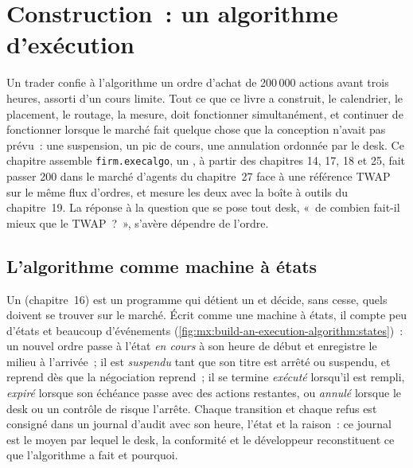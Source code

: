 \chapter{Construction~: un algorithme d'exécution}\label{ch:mx:build-an-execution-algorithm}

Un trader confie à l'algorithme un ordre d'achat de 200\,000 actions avant trois heures, assorti d'un cours limite. Tout ce que ce livre a construit, le calendrier,
le placement, le routage, la mesure, doit fonctionner simultanément, et continuer de fonctionner lorsque le marché fait quelque chose que la conception n'avait pas prévu~: une suspension, un pic de cours,
une annulation ordonnée par le desk. Ce chapitre assemble \texttt{firm.execalgo}, un , à partir des chapitres 14, 17, 18 et 25, fait passer
200  dans le marché d'agents du chapitre~27 face à une référence TWAP sur le même flux d'ordres, et mesure les deux avec la boîte à outils du chapitre~19. La
réponse à la question que se pose tout desk, «~de combien fait-il mieux que le TWAP~?~», s'avère dépendre de l'ordre.

\section{L'algorithme comme machine à états}

Un  (chapitre~16) est un programme qui détient un  et décide, sans cesse, quels  doivent se trouver sur le marché.
Écrit comme une machine à états, il compte peu d'états et beaucoup d'événements (\cref{fig:mx:build-an-execution-algorithm:states})~: un nouvel ordre passe à l'état \emph{en cours}
à son heure de début et enregistre le milieu à l'arrivée~; il est \emph{suspendu} tant que son titre est arrêté ou suspendu, et reprend dès que la négociation reprend~; il se termine \emph{exécuté}
lorsqu'il est rempli, \emph{expiré} lorsque son échéance passe avec des actions restantes, ou \emph{annulé} lorsque le desk ou un contrôle de risque l'arrête. Chaque transition et
chaque refus est consigné dans un journal d'audit avec son heure, l'état et la raison~: ce journal est le moyen par lequel le desk, la conformité et le développeur reconstituent ce que
l'algorithme a fait et pourquoi.


